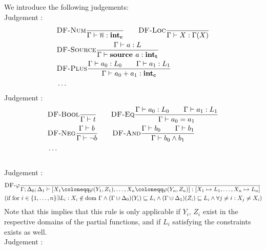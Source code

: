 We introduce the following judgements:
\\
Judgement :
\begin{align*}
    &\textsc{DF-Num}\frac{\displaystyle }{\displaystyle \Gamma \vdash {\overline{n}}: \textbf{int}_\textbf{c}}\qquad
    \textsc{DF-Loc}\frac{\displaystyle }{\displaystyle \Gamma \vdash {X}: \Gamma(X)}\\
    &\textsc{DF-Source}\frac{\displaystyle \Gamma \vdash {a}: L}{\displaystyle \Gamma \vdash {\textbf{source }{a}}: \textbf{int}_\textbf{t}}\\
    &\textsc{DF-Plus}\frac{\displaystyle \Gamma \vdash {a_0}: L_0\qquad\Gamma \vdash {a_1}: L_1}{\displaystyle \Gamma \vdash {a_0+a_1}: \textbf{int}_\textbf{c}}\\
    &\ldots
\end{align*}
Judgement :
\begin{align*}
    &\textsc{DF-Bool}\frac{\displaystyle }{\displaystyle \Gamma \vdash {t}}\qquad
    \textsc{DF-Eq}\frac{\displaystyle \Gamma \vdash {a_0}: L_0\qquad \Gamma \vdash {a_1}: L_1}{\displaystyle \Gamma \vdash {a_0 = a_1}}\\
    &\textsc{DF-Neg}\frac{\displaystyle \Gamma \vdash {b}}{\displaystyle \Gamma \vdash {\neg b}}\qquad
    \textsc{DF-And}\frac{\displaystyle \Gamma \vdash {b_0}\qquad\Gamma \vdash {b_1}}{\displaystyle \Gamma \vdash {b_0 \land b_1}}\\
    &\ldots
\end{align*}
\\
Judgement :
\begin{align*}
    &\trule{DF-$\varphi$}{}{\typestep{\Gamma;\Delta_0;\Delta_1}{\defaultphilistn}{[X_1 \mapsto L_1, \ldots, X_n \mapsto L_n]}}\\
    &\text{(if for $i \in \{1, \ldots, n\} \exists L_i: X_i \notin \dom\Gamma \land (\Gamma \dunion \Delta_0)(Y_i) \sqsubseteq L_i \land (\Gamma \dunion \Delta_1)(Z_i) \sqsubseteq L_i
    \land \forall j \neq i: X_j \neq X_i$)}
\end{align*}
Note that this implies that this rule is only applicable if $Y_i$, $Z_i$ exist in the respective
domains of the partial functions, and if $L_i$ satisfying the constraints exists as well.\\
Judgement :
